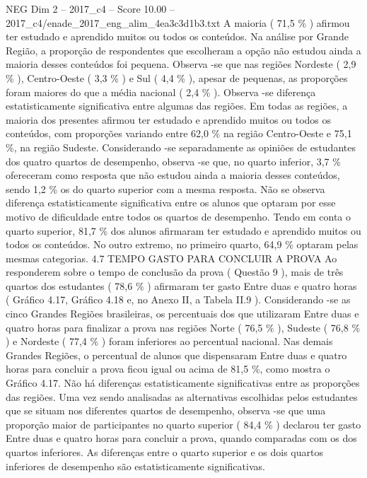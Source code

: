 \begin{textsample}{NEG Dim 2 – 2017\_c4 – Score 10.00 – 2017\_c4/enade\_2017\_eng\_alim\_4ea3c3d1b3.txt}
A maioria ( 71,5 \% ) afirmou ter estudado e aprendido muitos ou todos os conteúdos.
Na análise por Grande Região, a proporção de respondentes que escolheram a opção não estudou ainda a maioria desses conteúdos foi pequena.
Observa -se que nas regiões Nordeste ( 2,9 \% ), Centro-Oeste ( 3,3 \% ) e Sul ( 4,4 \% ), apesar de pequenas, as proporções foram maiores do que a média nacional ( 2,4 \% ).
Observa -se diferença estatisticamente significativa entre algumas das regiões.
Em todas as regiões, a maioria dos presentes afirmou ter estudado e aprendido muitos ou todos os conteúdos, com proporções variando entre 62,0 \% na região Centro-Oeste e 75,1 \%, na região Sudeste.
Considerando -se separadamente as opiniões de estudantes dos quatro quartos de desempenho, observa -se que, no quarto inferior, 3,7 \% ofereceram como resposta que não estudou ainda a maioria desses conteúdos, sendo 1,2 \% os do quarto superior com a mesma resposta.
Não se observa diferença estatisticamente significativa entre os alunos que optaram por esse motivo de dificuldade entre todos os quartos de desempenho.
Tendo em conta o quarto superior, 81,7 \% dos alunos afirmaram ter estudado e aprendido muitos ou todos os conteúdos.
No outro extremo, no primeiro quarto, 64,9 \% optaram pelas mesmas categorias. 4.7 TEMPO GASTO PARA CONCLUIR A PROVA Ao responderem sobre o tempo de conclusão da prova ( Questão 9 ), mais de três quartos dos estudantes ( 78,6 \% ) afirmaram ter gasto Entre duas e quatro horas ( Gráfico 4.17, Gráfico 4.18 e, no Anexo II, a Tabela II.9 ).
Considerando -se as cinco Grandes Regiões brasileiras, os percentuais dos que utilizaram Entre duas e quatro horas para finalizar a prova nas regiões Norte ( 76,5 \% ), Sudeste ( 76,8 \% ) e Nordeste ( 77,4 \% ) foram inferiores ao percentual nacional.
Nas demais Grandes Regiões, o percentual de alunos que dispensaram Entre duas e quatro horas para concluir a prova ficou igual ou acima de 81,5 \%, como mostra o Gráfico 4.17.
Não há diferenças estatisticamente significativas entre as proporções das regiões.
Uma vez sendo analisadas as alternativas escolhidas pelos estudantes que se situam nos diferentes quartos de desempenho, observa -se que uma proporção maior de participantes no quarto superior ( 84,4 \% ) declarou ter gasto Entre duas e quatro horas para concluir a prova, quando comparadas com os dos quartos inferiores.
As diferenças entre o quarto superior e os dois quartos inferiores de desempenho são estatisticamente significativas.

\end{textsample}
